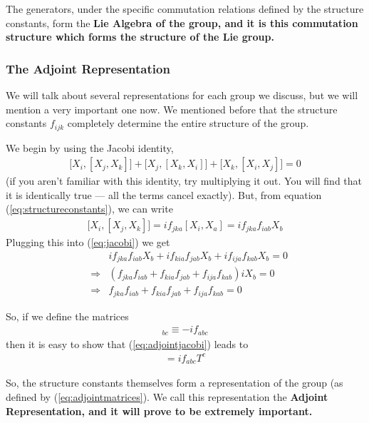 \documentclass[12pt,epsf]{article}
\def\nolabel{\nonumber }
\def\nolabel{\nonumber }
\begin{document}
The generators, under the specific commutation relations defined by the
structure constants, form the \bf Lie Algebra \rm of the group, and it
is this commutation structure which forms the structure of the Lie
group.	

\subsubsection{The Adjoint Representation}
\label{sec:adjoint}

We will talk about several representations for each group we discuss,
but we will mention a very important one now.  We mentioned before that
the structure constants $f_{ijk}$ completely determine the entire
structure of the group.  

We begin by using the Jacobi identity,
\begin{eqnarray}
\big[X_i,[X_j,X_k]\big]+\big[X_j,[X_k,X_i]\big]+\big[X_k,[X_i,X_j]\big]
= 0 \label{eq:jacobi}
\end{eqnarray}
(if you aren't familiar with this identity, try multiplying it out.
You will find that it is identically true --- all the terms cancel
exactly).  But, from equation (\ref{eq:structureconstants}), we can
write
\begin{eqnarray}
\big[X_i,[X_j,X_k]\big] = if_{jka}[X_i,X_a] = if_{jka}f_{iab}X_b
\nolabel 
\end{eqnarray}
Plugging this into (\ref{eq:jacobi}) we get 
\begin{eqnarray}
& &if_{jka}f_{iab}X_b+if_{kia}f_{jab}X_b + if_{ija}f_{kab}X_b = 0
\nolabel \\
&\Rightarrow& (f_{jka}f_{iab}+f_{kia}f_{jab}+f_{ija}f_{kab})iX_b = 0
\nolabel \\
&\Rightarrow& f_{jka}f_{iab}+f_{kia}f_{jab}+f_{ija}f_{kab} = 0
\label{eq:adjointjacobi}
\end{eqnarray}

So, if we define the matrices 
\begin{eqnarray}
[T^a]_{bc} \equiv -if_{abc} \label{eq:adjointmatrices}
\end{eqnarray}
then it is easy to show that (\ref{eq:adjointjacobi}) leads to 
\begin{eqnarray}
[T^a,T^b] = if_{abc}T^c \nolabel 
\end{eqnarray}

So, the structure constants themselves form a representation of the
group (as defined by (\ref{eq:adjointmatrices}).  We call this
representation the \bf Adjoint Representation\rm, and it will prove to
be extremely important.  
\end{document}
